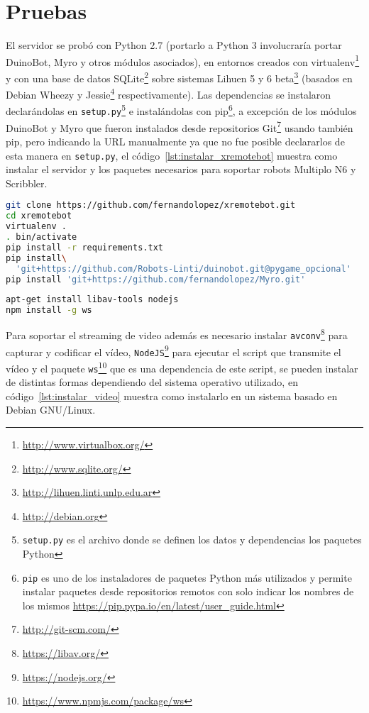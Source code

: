 \chapter{Pruebas}\label{cha:pruebas}

El servidor se probó con Python 2.7 (portarlo a Python 3 involucraría
portar DuinoBot, Myro y otros módulos asociados), en entornos creados
con virtualenv\footnote{\url{http://www.virtualbox.org/}}
y con una base de datos
SQLite\footnote{\url{http://www.sqlite.org/}}
sobre
sistemas Lihuen 5 y 6 beta\footnote{\url{http://lihuen.linti.unlp.edu.ar}}
(basados en Debian Wheezy y Jessie\footnote{\url{http://debian.org}}
respectivamente).
Las dependencias se instalaron declarándolas en
\texttt{setup.py}\footnote{\texttt{setup.py} es el archivo donde se definen los
datos y dependencias los paquetes Python}
e instalándolas
con pip\footnote{\texttt{pip} es uno de los instaladores de paquetes Python
más utilizados y permite instalar paquetes desde repositorios remotos
con solo indicar los nombres de los mismos
\url{https://pip.pypa.io/en/latest/user_guide.html}},
a excepción de los módulos DuinoBot y Myro que fueron instalados
desde repositorios Git\footnote{\url{http://git-scm.com/}}
usando también pip, pero indicando la URL manualmente
ya que no fue posible declararlos de esta manera en \texttt{setup.py}, el
código~\ref{lst:instalar_xremotebot} muestra como instalar el servidor
y los paquetes necesarios para soportar robots Multiplo N6 y Scribbler.

\begin{lstlisting}[language=bash,
caption={Instalación de XRemoteBot},
label=lst:instalar_xremotebot]
git clone https://github.com/fernandolopez/xremotebot.git
cd xremotebot
virtualenv .
. bin/activate
pip install -r requirements.txt
pip install\
  'git+https://github.com/Robots-Linti/duinobot.git@pygame_opcional'
pip install 'git+https://github.com/fernandolopez/Myro.git'
\end{lstlisting}

\begin{lstlisting}[language=bash,
caption={Instalación del soporte de video para XRemoteBot},
label=lst:instalar_video]
apt-get install libav-tools nodejs
npm install -g ws
\end{lstlisting}

Para soportar el streaming de video además es necesario instalar
\texttt{avconv}\footnote{\url{https://libav.org/}} para capturar
y codificar el vídeo,
\texttt{NodeJS}\footnote{\url{https://nodejs.org/}} para ejecutar
el script que transmite el vídeo
y el paquete
\texttt{ws}\footnote{\url{https://www.npmjs.com/package/ws}}
que es una dependencia de este script,
se pueden instalar de distintas formas dependiendo del sistema operativo
utilizado, en código~\ref{lst:instalar_video} muestra como instalarlo
en un sistema basado en Debian GNU/Linux.

